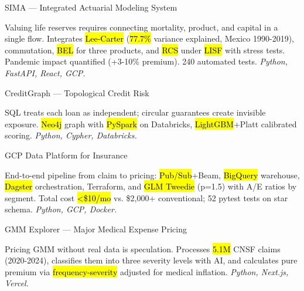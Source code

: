 \documentclass[10pt, letterpaper]{awesome-cv}
\begin{document}
\begin{cventries}

  \cventry
    {SIMA — Integrated Actuarial Modeling System}
    {}
    {}
    {}
    {
      \begin{cvitems}
        \item {Valuing life reserves requires connecting mortality, product, and capital in a single flow. Integrates \hl{Lee-Carter} (\hl{77.7\%} variance explained, Mexico 1990-2019), commutation, \hl{BEL} for three products, and \hl{RCS} under \hl{LISF} with stress tests. Pandemic impact quantified (+3-10\% premium). 240 automated tests. \textit{Python, FastAPI, React, GCP.}}
      \end{cvitems}
    }

  \cventry
    {CreditGraph — Topological Credit Risk}
    {}
    {}
    {}
    {
      \begin{cvitems}
        \item {SQL treats each loan as independent; circular guarantees create invisible exposure. \hl{Neo4j} graph with \hl{PySpark} on Databricks, \hl{LightGBM}+Platt calibrated scoring. \textit{Python, Cypher, Databricks.}}
      \end{cvitems}
    }

  \cventry
    {GCP Data Platform for Insurance}
    {}
    {}
    {}
    {
      \begin{cvitems}
        \item {End-to-end pipeline from claim to pricing: \hl{Pub/Sub}+Beam, \hl{BigQuery} warehouse, \hl{Dagster} orchestration, Terraform, and \hl{GLM Tweedie} (p=1.5) with A/E ratios by segment. Total cost \hl{<\$10/mo} vs. \$2,000+ conventional; 52 pytest tests on star schema. \textit{Python, GCP, Docker.}}
      \end{cvitems}
    }

  \cventry
    {GMM Explorer — Major Medical Expense Pricing}
    {}
    {}
    {}
    {
      \begin{cvitems}
        \item {Pricing GMM without real data is speculation. Processes \hl{5.1M} CNSF claims (2020-2024), classifies them into three severity levels with AI, and calculates pure premium via \hl{frequency-severity} adjusted for medical inflation. \textit{Python, Next.js, Vercel.}}
      \end{cvitems}
    }

\end{cventries}
\end{document}
